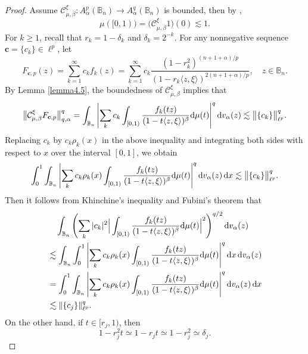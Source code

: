 \documentclass[preprint,12pt,times]{elsarticle}
\theoremstyle{definition}
\theoremstyle{remark}
\numberwithin{equation}{section}
\begin{document}
\begin{proof}
Assume $\mathcal{C}_{\mu,\beta}^{\xi}: A_{\alpha}^p(\mathbb{B}_n)\to A_{\alpha}^q(\mathbb{B}_n)$ is bounded, then by \cite[Theorem 2.1]{Zhu2005},
\[
    \mu([0,1))=\big(\mathcal{C}_{\mu,\beta}^{\xi}1\big)(0)\lesssim 1.
\]
For $k\geq 1$, recall that $r_k=1-\delta_k$ and $\delta_k=2^{-k}$. For any nonnegative sequence $\mathbf{c}=\{c_k\}\in \ell^p$, let
\[
    F_{\mathbf{c},p}(z)=\sum_{k=1}^{\infty}c_kf_k(z)=\sum_{k=1}^{\infty}c_k\frac{(1-r_k^2)^{(n+1+\alpha)/p}}{(1-r_k\langle z,\xi\rangle)^{2(n+1+\alpha)/p}},\quad z\in\mathbb{B}_n.
\]
By Lemma \ref{lemma4.5}, the boundedness of $\mathcal{C}_{\mu,\beta}^{\xi}$ implies that
\begin{equation*}
\big\|\mathcal{C}_{\mu,\beta}^{\xi}F_{\mathbf{c},p}\big\|_{q,\alpha}^q=\int_{\mathbb{B}_n}\left|\sum_{k}c_k\int_{[0,1)}\frac{f_k(tz)}{(1-t\langle z,\xi\rangle)^{\beta}}{\rm d}\mu(t)\right|^q{\rm d}v_{\alpha}(z)\lesssim \big\|\{c_k\}\big\|_{\ell^p}^q.
\end{equation*}
Replacing $c_k$ by $c_k\rho_k(x)$ in the above inequality and integrating both sides with respect to $x$ over the interval $[0,1]$, we obtain
\begin{equation*}
\int_{0}^1\int_{\mathbb{B}_n}\left|\sum_{k}c_k\rho_k(x)\int_{[0,1)}\frac{f_k(tz)}{(1-t\langle z,\xi\rangle)^{\beta}}{\rm d}\mu(t)\right|^q{\rm d}v_{\alpha}(z)\,{\rm d}x\lesssim \big\|\{c_k\}\big\|_{\ell^p}^q.
\end{equation*}
Then it follows from Khinchine's inequality and Fubini's theorem that
\begin{equation}\label{equa4.9}
\begin{split}
&\quad \int_{\mathbb{B}_n}\left(\sum_{k}|c_k|^2\Big|\int_{[0,1)}\frac{f_k(tz)}{(1-t\langle z,\xi\rangle)^{\beta}}{\rm d}\mu(t)\Big|^2\right)^{q/2}{\rm d}v_{\alpha}(z)\\
&\lesssim \int_{\mathbb{B}_n}\int_{0}^1\left|\sum_{k}c_k\rho_k(x)\int_{[0,1)}\frac{f_k(tz)}{(1-t\langle z,\xi\rangle)^{\beta}}{\rm d}\mu(t)\right|^q{\rm d}x\,{\rm d}v_{\alpha}(z)\\
&=\int_{0}^1\int_{\mathbb{B}_n}\left|\sum_{k}c_k\rho_k(x)\int_{[0,1)}\frac{f_k(tz)}{(1-t\langle z,\xi\rangle)^{\beta}}{\rm d}\mu(t)\right|^q{\rm d}v_{\alpha}(z)\,{\rm d}x\\
&\lesssim \|\{c_j\}\|_{\ell^p}^q.
\end{split}
\end{equation}
On the other hand, if $t\in [r_j,1)$, then
\[
    1-r_j^2 t\simeq 1-r_j t\simeq 1-r_j^2\simeq \delta_j.
\]

\end{proof}
\end{document}
